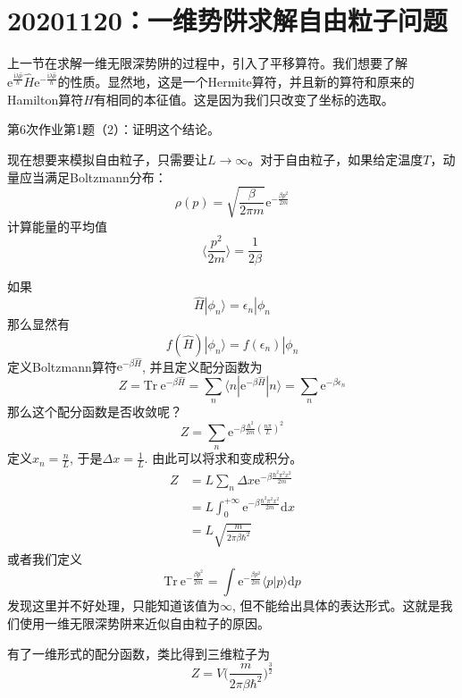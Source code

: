     \section{20201120：一维势阱求解自由粒子问题}
        上一节在求解一维无限深势阱的过程中，引入了平移算符。我们想要了解$\mathrm{e}^{\frac {\mathrm{i}\lambda \hat{p}}{\hbar}} \hat{H} \mathrm{e}^{-\frac {\mathrm{i}\lambda \hat{p}}{\hbar}}$的性质。显然地，这是一个Hermite算符，并且新的算符和原来的Hamilton算符$\hat{H}$有相同的本征值。这是因为我们只改变了坐标的选取。
        \begin{asg}
            第6次作业第1题（2）：证明这个结论。
        \end{asg}
        现在想要来模拟自由粒子，只需要让$L \to \infty$。对于自由粒子，如果给定温度$T$，动量应当满足Boltzmann分布：
        \[ \rho(p) = \sqrt{\frac {\beta}{2\pi m}}\mathrm{e}^{-\frac {\beta p^2}{2m}} \]
        计算能量的平均值
        \[ \langle \frac {p^2}{2m} \rangle = \frac 1{2\beta} \]

        如果
        \[ \hat{H} | \phi_n \rangle = \epsilon_n |\phi_n \]
        那么显然有
        \[ f(\hat{H})|\phi_n \rangle = f(\epsilon_n)|\phi_n \]
        定义Boltzmann算符$\mathrm{e}^{-\beta\hat{H}}$, 并且定义配分函数为
        \[ Z = \mathrm{Tr}\  \mathrm{e}^{-\beta \hat{H}} = \sum_n \langle n| \mathrm{e}^{-\beta \hat{H}} | n \rangle = \sum_n \mathrm{e}^{-\beta \epsilon_n }\]
        那么这个配分函数是否收敛呢？
        \[ Z = \sum_n \mathrm{e}^{-\beta \frac {\hbar^2}{2m} (\frac {n\pi}L)^2} \]
        定义$x_n = \frac nL$, 于是$\Delta x = \frac 1L$. 由此可以将求和变成积分。
        \begin{align*}
            Z &= L \sum_n \Delta x \mathrm{e}^{-\beta \frac {\hbar^2\pi^2 x^2}{2m} }\\
            &= L \int_0^{+\infty} \mathrm{e}^{-\beta \frac {\hbar^2\pi^2 x^2}{2m}} \mathrm{d}x\\
            &= L\sqrt{\frac m{2\pi \beta \hbar^2}}
        \end{align*}
        或者我们定义
        \[ \mathrm{Tr} \ \mathrm{e}^{-\frac {\beta \hat{p}^2}{2m}} = \int \mathrm{e}^{-\frac {\beta p^2}{2m}} \langle p|p\rangle \mathrm{d}p \]
        发现这里并不好处理，只能知道该值为$\infty$, 但不能给出具体的表达形式。这就是我们使用一维无限深势阱来近似自由粒子的原因。

        有了一维形式的配分函数，类比得到三维粒子为
        \[ Z = V \bigg(\frac m{2\pi \beta \hbar^2}\bigg)^{\frac 32} \]

